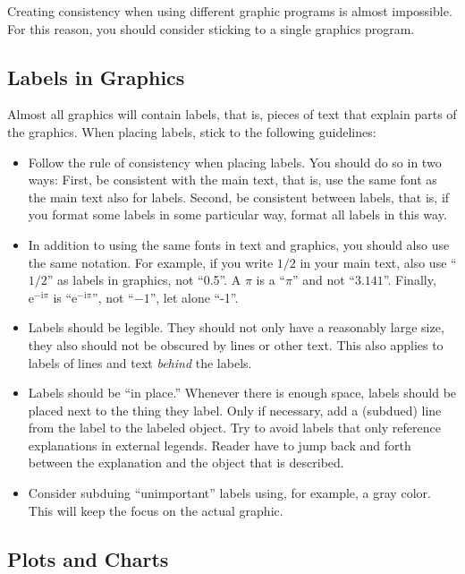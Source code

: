Creating consistency when using different graphic programs is almost
impossible. For this reason, you should consider sticking to a single graphics
program.


\subsection{Labels in Graphics}

Almost all graphics will contain labels, that is, pieces of text that explain
parts of the graphics. When placing labels, stick to the following guidelines:
%
\begin{itemize}
    \item Follow the rule of consistency when placing labels. You should do
        so in two ways: First, be consistent with the main text, that is, use
        the same font as the main text also for labels. Second, be consistent
        between labels, that is, if you format some labels in some particular
        way, format all labels in this way.
    \item In addition to using the same fonts in text and graphics, you
        should also use the same notation. For example, if you write $1/2$ in
        your main text, also use ``$1/2$'' as labels in graphics, not
        ``0.5''. A $\pi$ is a ``$\pi$'' and not ``$3.141$''. Finally,
        $\mathrm e^{-\mathrm i \pi}$ is ``$\mathrm e^{-\mathrm i \pi}$'', not
        ``$-1$'', let alone ``-1''.
    \item Labels should be legible. They should not only have a reasonably
        large size, they also should not be obscured by lines or other text.
        This also applies to labels of lines and text \emph{behind} the
        labels.
    \item Labels should be ``in  place.'' Whenever there is enough space,
        labels should be placed next to the thing they label. Only if
        necessary, add a (subdued) line from the label to the labeled object.
        Try to avoid labels that only reference explanations in external
        legends. Reader have to jump back and forth between the explanation
        and the object that is described.
    \item Consider subduing ``unimportant'' labels using, for example, a gray
        color. This will keep the focus on the actual graphic.
\end{itemize}


\subsection{Plots and Charts}

